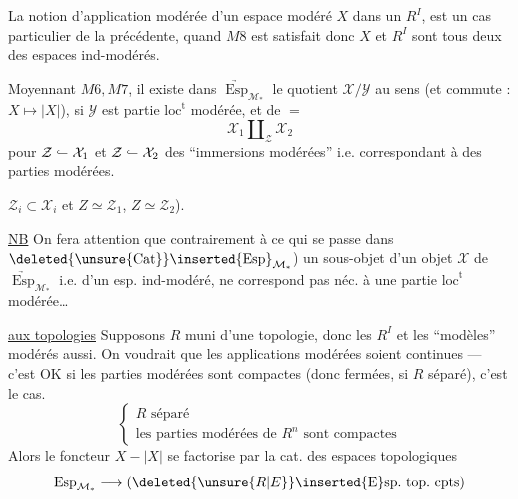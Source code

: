 La notion d'application modérée d'un espace modéré $X$ dans un $R^I$, est un cas particulier de la précédente, quand $M8$ est satisfait donc $X$ et $R^I$ sont tous deux des espaces ind-modérés.

Moyennant $M6,M7$, il existe  dans $\underrightarrow{\operatorname{Esp}}_{\mathcal M_*}$ le quotient $\mathcal X/\mathcal Y$ au sens (et commute : $X\mapsto|X|$), si $\mathcal Y$ est partie $\mathrm{loc}^{\mathrm t}$ modérée, et de $=$
\[
 \mathcal X_1\amalg_{\mathcal Z}\mathcal X_2
\]
pour $\mathcal Z\lhook\joinrel\relbar\mathcal X_1$ et $\mathcal Z\lhook\joinrel\relbar\mathcal X_2$ des ``immersions modérées'' i.e. correspondant à des parties  modérées.

$\mathcal Z_i\subset\mathcal X_i$ et $Z\simeq\mathcal Z_1$, $Z\simeq\mathcal Z_2$).

\uline{NB} On fera attention que contrairement à ce qui se passe dans $\deleted{\unsure{\operatorname{Cat}}}\inserted{\operatorname{Esp}}_{\mathcal M_*}$) un sous-objet d'un objet $\mathcal X$ de $\underrightarrow{\operatorname{Esp}}_{\mathcal M_*}$ i.e. d'un esp. ind-modéré, ne correspond pas néc. à une partie $\mathrm{loc}^{\mathrm t}$ modérée\ldots

\uline{ aux topologies} Supposons $R$ muni d'une topologie, donc les $R^I$ et les ``modèles'' modérés aussi. On voudrait que les applications modérées soient continues --- c'est OK si les parties modérées sont compactes (donc fermées, si $R$ séparé), c'est le cas.  
\[
 \left\{\begin{array}{l}R\text{ séparé}\\
 \text{les parties modérées de }R^n\text{ sont compactes}
 \end{array}\right.
\]
Alors le foncteur $X\mathbin{-}|X|$ se factorise par la cat. des espaces topologiques
\[
 \operatorname{Esp}_{\mathcal M_*}\longrightarrow(\deleted{\unsure{R|E}}\inserted{\mathrm E}\mathrm{sp.\ top.\ cpts})
\]

